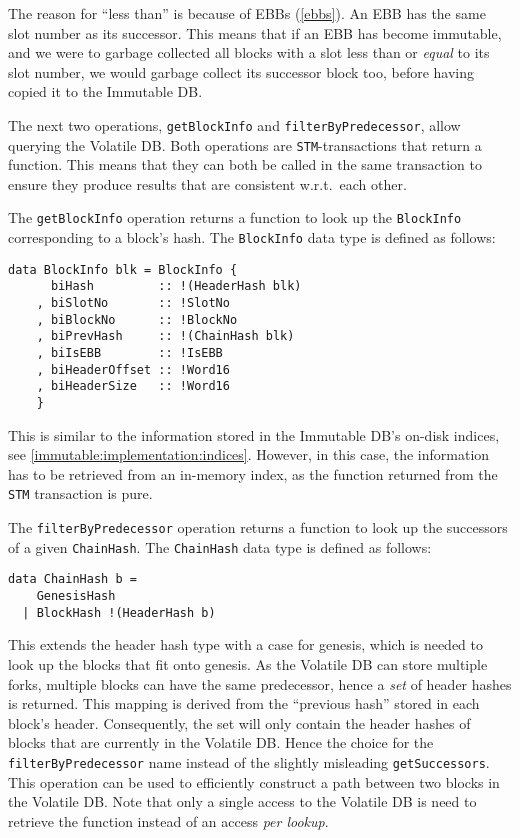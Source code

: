 The reason for ``less than'' is because of EBBs (\cref{ebbs}). An EBB has the
same slot number as its successor. This means that if an EBB has become
immutable, and we were to garbage collected all blocks with a slot less than or
\emph{equal} to its slot number, we would garbage collect its successor block
too, before having copied it to the Immutable DB.

The next two operations, \lstinline!getBlockInfo! and
\lstinline!filterByPredecessor!, allow querying the Volatile DB. Both operations
are \lstinline!STM!-transactions that return a function. This means that they
can both be called in the same transaction to ensure they produce results that
are consistent w.r.t.\ each other.

The \lstinline!getBlockInfo! operation returns a function to look up the
\lstinline!BlockInfo! corresponding to a block's hash. The \lstinline!BlockInfo!
data type is defined as follows:
\begin{lstlisting}
data BlockInfo blk = BlockInfo {
      biHash         :: !(HeaderHash blk)
    , biSlotNo       :: !SlotNo
    , biBlockNo      :: !BlockNo
    , biPrevHash     :: !(ChainHash blk)
    , biIsEBB        :: !IsEBB
    , biHeaderOffset :: !Word16
    , biHeaderSize   :: !Word16
    }
\end{lstlisting}
This is similar to the information stored in the Immutable DB's on-disk indices,
see \cref{immutable:implementation:indices}. However, in this case, the
information has to be retrieved from an in-memory index, as the function
returned from the \lstinline!STM! transaction is pure.

The \lstinline!filterByPredecessor! operation returns a function to look up the
successors of a given \lstinline!ChainHash!. The \lstinline!ChainHash! data type
is defined as follows:
\begin{lstlisting}
data ChainHash b =
    GenesisHash
  | BlockHash !(HeaderHash b)
\end{lstlisting}
This extends the header hash type with a case for genesis, which is needed to
look up the blocks that fit onto genesis. As the Volatile DB can store multiple
forks, multiple blocks can have the same predecessor, hence a \emph{set} of
header hashes is returned. This mapping is derived from the ``previous hash''
stored in each block's header. Consequently, the set will only contain the
header hashes of blocks that are currently in the Volatile DB. Hence the choice
for the \lstinline!filterByPredecessor! name instead of the slightly misleading
\lstinline!getSuccessors!. This operation can be used to efficiently construct a
path between two blocks in the Volatile DB. Note that only a single access to
the Volatile DB is need to retrieve the function instead of an access \emph{per
lookup}.

